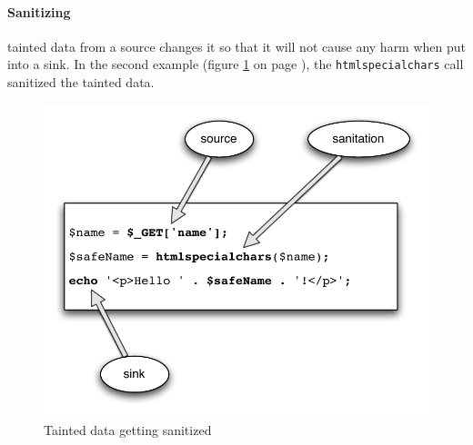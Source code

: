 \paragraph{Sanitizing} tainted data from a source changes it so that it will not cause any harm when put into a sink. In the second example (figure \ref{fig:taint-and-clean} on page \pageref{fig:taint-and-clean}), the \texttt{htmlspecialchars} call sanitized the tainted data.

\begin{figure}[!h]
 \includegraphics[scale=0.8]{images/taint-and-clean}
 \caption{Tainted data getting sanitized}
 \label{fig:taint-and-clean}
\end{figure}

